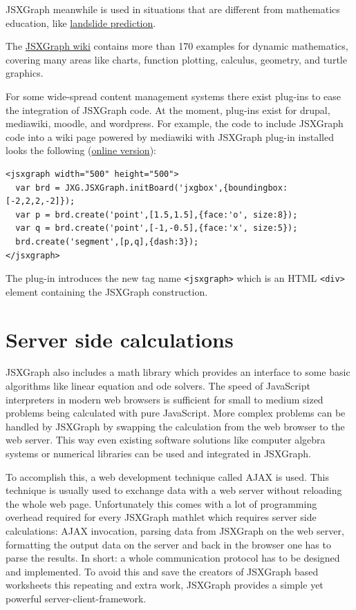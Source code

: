 \documentclass[12pt,a4paper]{article}%
\begin{document}
JSXGraph meanwhile is used in situations that are different 
from mathematics education, like 
\href{http://www.rhok.org/2010/06/rhok-1-0-washington-d-c-winning-hack-chasm/}{landslide prediction}. 

The \href{http://jsxgraph.uni-bayreuth.de/wiki}{JSXGraph wiki} 
contains more than 170 examples for dynamic mathematics, 
covering many areas like charts, function plotting, calculus, geometry, and turtle graphics.

For some wide-spread content management systems there exist plug-ins to ease the integration
of JSXGraph code. 
At the moment, plug-ins exist for drupal, mediawiki, moodle, and wordpress. 
For example, the code to include JSXGraph code into a wiki page powered by mediawiki with JSXGraph plug-in installed
looks the following (\href{http://jsxgraph.uni-bayreuth.de/wiki/index.php/MediaWiki_example}{online version}):

{\footnotesize
\begin{verbatim}
<jsxgraph width="500" height="500">
  var brd = JXG.JSXGraph.initBoard('jxgbox',{boundingbox:[-2,2,2,-2]});
  var p = brd.create('point',[1.5,1.5],{face:'o', size:8});
  var q = brd.create('point',[-1,-0.5],{face:'x', size:5});
  brd.create('segment',[p,q],{dash:3});
</jsxgraph>
\end{verbatim}}
The plug-in introduces the new tag name \verb|<jsxgraph>| which is an HTML \verb|<div>| element
containing the JSXGraph construction.


\section{Server side calculations}\label{sec:loci}

JSXGraph also includes a math library which provides an interface to some basic algorithms like linear equation and ode
solvers. The speed of JavaScript interpreters in modern web browsers is sufficient for small to medium sized problems
being calculated with pure JavaScript. More complex problems can be handled by JSXGraph by swapping the calculation from
the web browser to the web server. This way even existing software solutions like computer algebra systems or numerical
libraries can be used and integrated in JSXGraph.

To accomplish this, a web development technique called AJAX is used. This technique is usually used to exchange data
with a web server without reloading the whole web page. Unfortunately this comes with a lot of programming overhead
required for every JSXGraph mathlet which requires server side calculations: AJAX invocation, parsing data from JSXGraph
on the web server, formatting the output data on the server and back in the browser one has to parse the results. In
short: a whole communication protocol has to be designed and implemented. To avoid this and save the creators of JSXGraph
based worksheets this repeating and extra work, JSXGraph provides a simple yet powerful server-client-framework.
\end{document}
